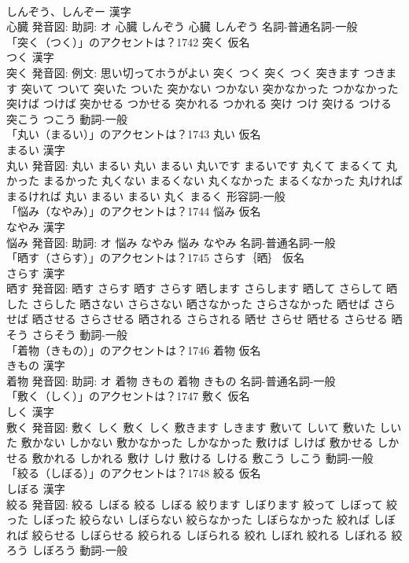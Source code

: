 \documentclass[8pt]{extreport}
\begin{document}
\begin{CJK}{UTF8}{min}
\\	しんぞう、しんぞー 漢字　
\\	心臓 発音図: 助詞: オ	心臓 しんぞう		心臓 しんぞう				名詞-普通名詞-一般 
\\	「突く（つく）」のアクセントは？1742	突く 仮名　
\\	つく 漢字　
\\	突く 発音図: 例文: 思い切ってホうがよい	突く つく		突く つく 突きます つきます 突いて ついて 突いた ついた 突かない つかない 突かなかった つかなかった 突けば つけば 突かせる つかせる 突かれる つかれる 突け つけ 突ける つける 突こう つこう				動詞-一般 
\\	「丸い（まるい）」のアクセントは？1743	丸い 仮名　
\\	まるい 漢字　
\\	丸い 発音図:	丸い まるい		丸い まるい 丸いです まるいです 丸くて まるくて 丸かった まるかった 丸くない まるくない 丸くなかった まるくなかった 丸ければ まるければ 丸い まるい まるい 丸く まるく				形容詞-一般 
\\	「悩み（なやみ）」のアクセントは？1744	悩み 仮名　
\\	なやみ 漢字　
\\	悩み 発音図: 助詞: オ	悩み なやみ		悩み なやみ				名詞-普通名詞-一般 
\\	「晒す（さらす）」のアクセントは？1745	さらす｛晒｝ 仮名　
\\	さらす 漢字　
\\	晒す 発音図:	晒す さらす		晒す さらす 晒します さらします 晒して さらして 晒した さらした 晒さない さらさない 晒さなかった さらさなかった 晒せば さらせば 晒させる さらさせる 晒される さらされる 晒せ さらせ 晒せる さらせる 晒そう さらそう				動詞-一般 
\\	「着物（きもの）」のアクセントは？1746	着物 仮名　
\\	きもの 漢字　
\\	着物 発音図: 助詞: オ	着物 きもの		着物 きもの				名詞-普通名詞-一般 
\\	「敷く（しく）」のアクセントは？1747	敷く 仮名　
\\	しく 漢字　
\\	敷く 発音図:	敷く しく		敷く しく 敷きます しきます 敷いて しいて 敷いた しいた 敷かない しかない 敷かなかった しかなかった 敷けば しけば 敷かせる しかせる 敷かれる しかれる 敷け しけ 敷ける しける 敷こう しこう				動詞-一般 
\\	「絞る（しぼる）」のアクセントは？1748	絞る 仮名　
\\	しぼる 漢字　
\\	絞る 発音図:	絞る しぼる		絞る しぼる 絞ります しぼります 絞って しぼって 絞った しぼった 絞らない しぼらない 絞らなかった しぼらなかった 絞れば しぼれば 絞らせる しぼらせる 絞られる しぼられる 絞れ しぼれ 絞れる しぼれる 絞ろう しぼろう				動詞-一般 

\end{CJK}
\end{document}
